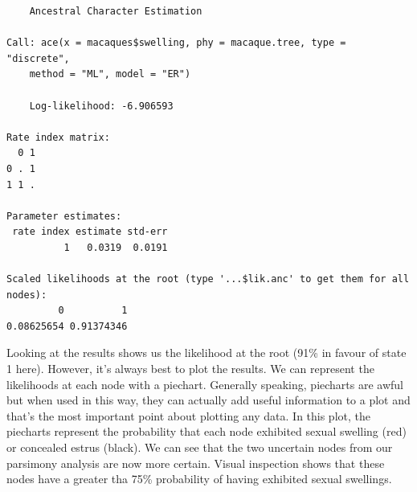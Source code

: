 \documentclass[
]{book}
\newenvironment{Shaded}{\begin{snugshade}}{\end{snugshade}}
\newcommand{\CommentTok}[1]{\textcolor[rgb]{0.56,0.35,0.01}{\textit{#1}}}
\newcommand{\DataTypeTok}[1]{\textcolor[rgb]{0.13,0.29,0.53}{#1}}
\newcommand{\KeywordTok}[1]{\textcolor[rgb]{0.13,0.29,0.53}{\textbf{#1}}}
\newcommand{\NormalTok}[1]{#1}
\newcommand{\OperatorTok}[1]{\textcolor[rgb]{0.81,0.36,0.00}{\textbf{#1}}}
\newcommand{\StringTok}[1]{\textcolor[rgb]{0.31,0.60,0.02}{#1}}
\begin{document}
\begin{Shaded}
\end{Shaded}

\begin{verbatim}
    Ancestral Character Estimation

Call: ace(x = macaques$swelling, phy = macaque.tree, type = "discrete", 
    method = "ML", model = "ER")

    Log-likelihood: -6.906593 

Rate index matrix:
  0 1
0 . 1
1 1 .

Parameter estimates:
 rate index estimate std-err
          1   0.0319  0.0191

Scaled likelihoods at the root (type '...$lik.anc' to get them for all nodes):
         0          1 
0.08625654 0.91374346 
\end{verbatim}

Looking at the results shows us the likelihood at the root (91\% in favour of state 1 here). However, it's always best to plot the results. We can represent the likelihoods at each node with a piechart. Generally speaking, piecharts are awful but when used in this way, they can actually add useful information to a plot and that's the most important point about plotting any data. In this plot, the piecharts represent the probability that each node exhibited sexual swelling (red) or concealed estrus (black). We can see that the two uncertain nodes from our parsimony analysis are now more certain. Visual inspection shows that these nodes have a greater tha 75\% probability of having exhibited sexual swellings.
\end{document}
